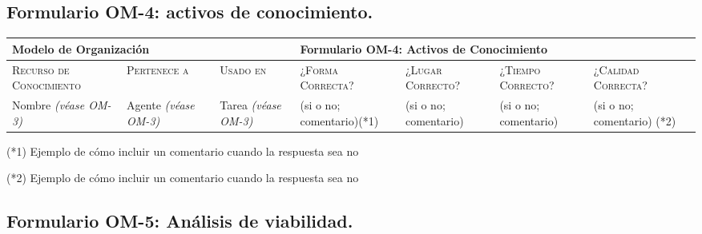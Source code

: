 \documentclass[12pt,a4paper,twoside,spanish]{article}      %
\begin{document}
        
        
        \pagebreak
        
        \subsection{Formulario OM-4: activos de conocimiento.}
        
            \begin{table}[H]
                \scriptsize
                \begin{tabularx}{\textwidth}{|p{1.3cm}|p{1.3cm}|p{1.3cm}|X|X|X|X|} \hline
                
                    \multicolumn{3}{|l}{\textbf{Modelo de Organización}} & \multicolumn{4}{|l|}{\textbf{Formulario OM-4: Activos de Conocimiento}} \\ \hline\hline
                    
                    \textsc{Recurso de Conocimiento} & \textsc{Pertenece a} &  \textsc{Usado en} &  \textsc{¿Forma
                    Correcta?} & \textsc{¿Lugar Correcto?} & \textsc{¿Tiempo Correcto?} & \textsc{¿Calidad Correcta?}\\ \hline
                    
                    Nombre \emph{(\textit{véase} OM-3)} & Agente \emph{(\textit{véase} OM-3)}& Tarea \emph{(\textit{véase} OM-3)}& (si o no; comentario)(*1)&
                    (si o no; comentario)& (si o no; comentario) & (si o no; comentario) (*2)\\ \hline
                    
                \end{tabularx}
                
                  \label{tab.OM4}
            \end{table}
            
            \noindent (*1) Ejemplo de cómo incluir un comentario cuando la respuesta sea no
            
            \noindent (*2) Ejemplo de cómo incluir un comentario cuando la respuesta sea no
            

            \pagebreak
            
        \subsection{Formulario OM-5: Análisis de viabilidad.}
        
\end{document}

